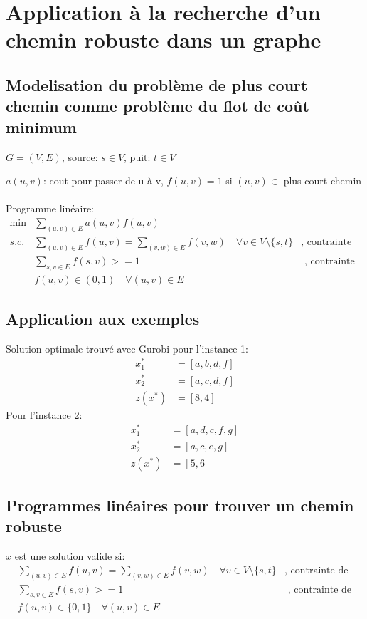 \documentclass[10pt,a4paper]{report}
\begin{document}
\chapter{Application à la recherche d’un chemin robuste dans un graphe}
\section{Modelisation du problème de plus court chemin comme problème du flot de coût minimum}

$G=(V,E)$, source: $s \in V$, puit: $t \in V$

$a(u,v)$: cout pour passer de u à v, $f(u,v)=1$ si $(u,v) \in $ {plus court chemin}\\\\
Programme linéaire:
\begin{align*}
\min&\sum_{(u,v)\in E} a(u,v)f(u,v)&\\
s.c.& \sum_{(u,v)\in E}f(u,v) = \sum_{(v,w)\in E}f(v,w) \quad \forall v \in V \setminus \{s, t\}& \text{, contrainte de conservation du flux}\\
    & \sum_{s,v \in E} f(s,v) >= 1 &\text{ , contrainte de flux sortant de la source}\\
    &f(u,v)\in (0,1) \quad \forall (u,v) \in E&
\end{align*}
\section{Application aux exemples}
Solution optimale trouvé avec Gurobi pour l'instance 1:
\begin{align*}
	x_1^{*} 	&= [a, b, d, f]\\
	x_2^*		&= [a, c, d, f]\\
	z(x^{*}) 	&= [8, 4]
\end{align*}
Pour l'instance 2:
\begin{align*}
	x_1^{*} 	&= [a, d, c, f, g]\\
	x_2^*		&= [a, c, e, g]\\
	z(x^{*}) 	&= [5, 6]
\end{align*}
\section{Programmes linéaires pour trouver un chemin robuste}
$x$ est une solution valide si:
\begin{align*}
           & \sum_{(u,v)\in E}f(u,v) = \sum_{(v,w)\in E}f(v,w) \quad \forall v \in V \setminus \{s, t\}& \text{, contrainte de conservation du flux}\\
            & \sum_{s,v \in E} f(s,v) >= 1 &\text{ , contrainte de flux sortant de la source}&\\
            &f(u,v)\in \{0,1\} \quad \forall (u,v) \in E&
\end{align*}
\end{document}
